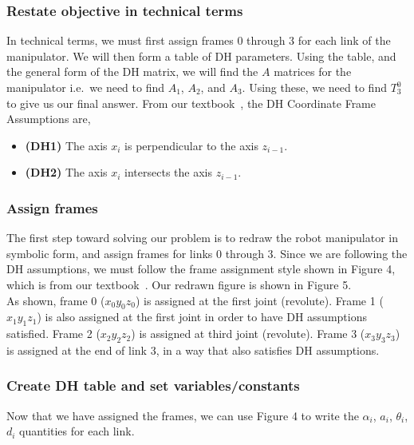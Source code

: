 \documentclass[conference]{IEEEtran}
\begin{document}
\subsubsection{Restate objective in technical terms}
In technical terms, we must first assign frames 0 through 3 for
each link of the manipulator. We will then form a table of DH
parameters. Using the table, and the general form of the DH matrix,
we will find the $A$ matrices for the manipulator i.e.\ we need to find
$A_1$, $A_2$, and $A_3$. Using these, we need to find $T^0_3$
to give us our final answer. From our textbook~\cite{Spong2006}, the 
DH Coordinate Frame Assumptions are,
\begin{itemize}
    \item \textbf{(DH1)} The axis $x_i$ is perpendicular to the axis $z_{i-1}$.
    \item \textbf{(DH2)} The axis $x_i$ intersects the axis $z_{i-1}$.
\end{itemize}
\vspace{0.1in}
\vspace{0.1in}
\subsubsection{Assign frames}
The first step toward solving our problem is to redraw the robot
manipulator in symbolic
form, and assign frames for links 0 through 3. Since we are following the DH assumptions,
we must follow the frame assignment style shown in Figure 4, which
is from our textbook~\cite{Spong2006}. Our redrawn figure is shown in Figure 5.\\

As shown, frame 0 ($x_0 y_0 z_0$) is assigned at the first joint (revolute). Frame 1
($x_1 y_1 z_1$) is also assigned at the
first joint in order to have DH assumptions satisfied. Frame 2 ($x_2 y_2 z_2$)
 is assigned at third joint (revolute). Frame 3 ($x_3 y_3 z_3$) is assigned at
the end of link 3, in a way that also satisfies DH assumptions.\\

\subsubsection{Create DH table and set variables/constants}
Now that we have assigned the frames, we can use Figure 4 to write
the $\alpha_i$, $a_i$, $\theta_i$, $d_i$ quantities for each link.
\end{document}
